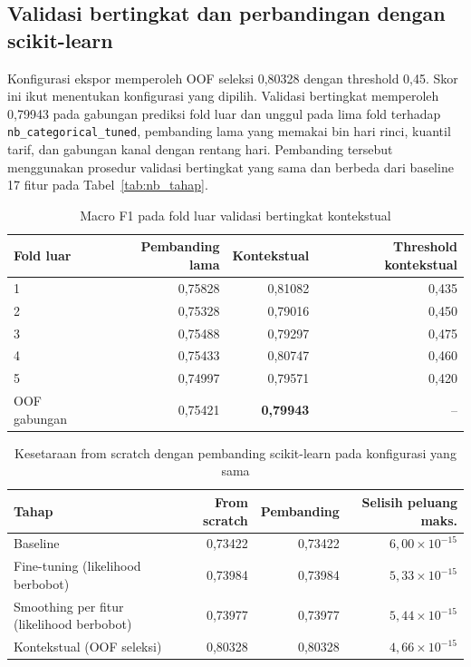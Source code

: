 \subsection{Validasi bertingkat dan perbandingan dengan scikit-learn}
Konfigurasi ekspor memperoleh OOF seleksi 0,80328 dengan threshold 0,45. Skor ini ikut menentukan konfigurasi yang dipilih. Validasi bertingkat memperoleh 0,79943 pada gabungan prediksi fold luar dan unggul pada lima fold terhadap \texttt{nb\_categorical\_tuned}, pembanding lama yang memakai bin hari rinci, kuantil tarif, dan gabungan kanal dengan rentang hari. Pembanding tersebut menggunakan prosedur validasi bertingkat yang sama dan berbeda dari baseline 17 fitur pada Tabel~\ref{tab:nb_tahap}.

\begin{table}[H]
\centering
\caption{Macro F1 pada fold luar validasi bertingkat kontekstual}
\label{tab:nb_nested}
\begin{tabular}{lrrr}
\toprule
Fold luar & Pembanding lama & Kontekstual & Threshold kontekstual \\
\midrule
1 & 0,75828 & 0,81082 & 0,435 \\
2 & 0,75328 & 0,79016 & 0,450 \\
3 & 0,75488 & 0,79297 & 0,475 \\
4 & 0,75433 & 0,80747 & 0,460 \\
5 & 0,74997 & 0,79571 & 0,420 \\
\midrule
OOF gabungan & 0,75421 & \textbf{0,79943} & -- \\
\bottomrule
\end{tabular}
\end{table}

\begin{table}[H]
\centering
\caption{Kesetaraan from scratch dengan pembanding scikit-learn pada konfigurasi yang sama}
\label{tab:nb}
\begin{tabularx}{\textwidth}{Xrrr}
\toprule
Tahap & From scratch & Pembanding & Selisih peluang maks. \\
\midrule
Baseline & 0,73422 & 0,73422 & \(6{,}00\times 10^{-15}\) \\
Fine-tuning (likelihood berbobot) & 0,73984 & 0,73984 & \(5{,}33\times 10^{-15}\) \\
Smoothing per fitur (likelihood berbobot) & 0,73977 & 0,73977 & \(5{,}44\times 10^{-15}\) \\
Kontekstual (OOF seleksi) & 0,80328 & 0,80328 & \(4{,}66\times 10^{-15}\) \\
\bottomrule
\end{tabularx}
\end{table}

